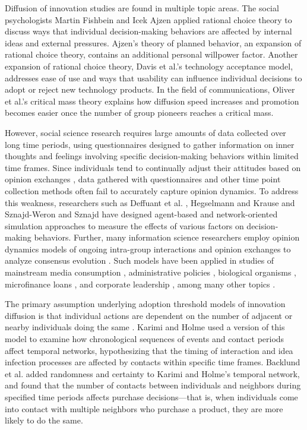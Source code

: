 \documentclass[10pt,letterpaper]{article}
\begin{document}
Diffusion of innovation studies are found in multiple topic areas. The social psychologists Martin Fishbein and Icek Ajzen \cite{Fishbein1975} applied rational choice theory to discuss ways that individual decision-making behaviors are affected by internal ideas and external pressures. Ajzen's \cite{Ajzen2020} theory of planned behavior, an expansion of rational choice theory, contains an additional personal willpower factor. Another expansion of rational choice theory, Davis et al.'s \cite{Davis1989} technology acceptance model, addresses ease of use and ways that usability can influence individual decisions to adopt or reject new technology products. In the field of communications, Oliver et al.'s \cite{Oliver1985} critical mass theory explains how diffusion speed increases and promotion becomes easier once the number of group pioneers reaches a critical mass.

However, social science research requires large amounts of data collected over long time periods, using questionnaires designed to gather information on inner thoughts and feelings involving specific decision-making behaviors within limited time frames. Since individuals tend to continually adjust their attitudes based on opinion exchanges \cite{Chacoma2015}, data gathered with questionnaires and other time point collection methods often fail to accurately capture opinion dynamics. To address this weakness, researchers such as Deffuant et al. \cite{Deffuant2002}, Hegselmann and Krause \cite{Hegselmann2002} and Sznajd-Weron and Sznajd \cite{SznajdWeron2000} have designed agent-based and network-oriented simulation approaches to measure the effects of various factors on decision-making behaviors. Further, many information science researchers employ opinion dynamics models of ongoing intra-group interactions and opinion exchanges to analyze consensus evolution \cite{Hegselmann2002}. Such models have been applied in studies of mainstream media consumption \cite{Quattrociocchi2014}, administrative policies \cite{Rai2015}, biological organisms \cite{Vuillon2015}, microfinance loans \cite{Banerjee2013}, and corporate leadership \cite{Dong2017,Dong2018}, among many other topics \cite{Berenbrink2024,Luo2020,Singh2013}.

The primary assumption underlying adoption threshold models of innovation diffusion is that individual actions are dependent on the number of adjacent or nearby individuals doing the same \cite{Valente1996,Watts2004}. Karimi and Holme \cite{Karimi2013} used a version of this model to examine how chronological sequences of events and contact periods affect temporal networks, hypothesizing that the timing of interaction and idea infection processes are affected by contacts within specific time frames. Backlund et al. \cite{Backlund2014} added randomness and certainty to Karimi and Holme's temporal network, and found that the number of contacts between individuals and neighbors during specified time periods affects purchase decisions---that is, when individuals come into contact with multiple neighbors who purchase a product, they are more likely to do the same.
\end{document}
